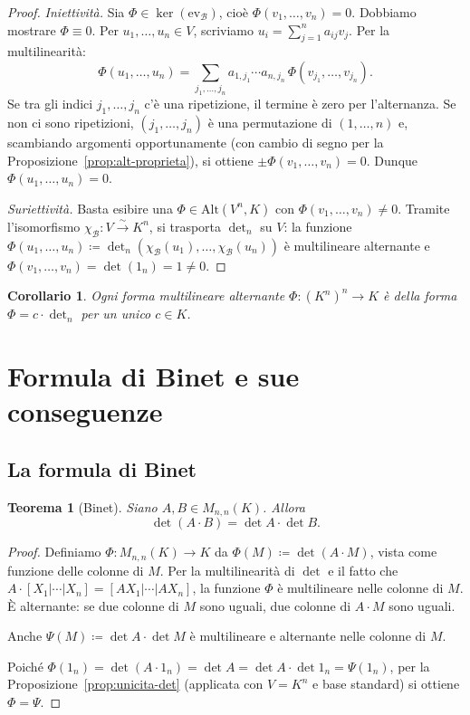 \documentclass[11pt, a4paper]{book}
\theoremstyle{definition}
\theoremstyle{plain}
\newtheorem{teorema}[definizione]{Teorema}
\newtheorem{corollario}[definizione]{Corollario}
\theoremstyle{remark}
\begin{document}
\begin{proof}
\emph{Iniettività.} Sia $\Phi \in \ker(\mathrm{ev}_{\mathcal{B}})$, cioè $\Phi(v_1,\ldots,v_n)=0$. Dobbiamo mostrare $\Phi \equiv 0$. Per $u_1,\ldots,u_n \in V$, scriviamo $u_i = \sum_{j=1}^n a_{ij}v_j$. Per la multilinearità:
\[
  \Phi(u_1,\ldots,u_n) = \sum_{j_1,\ldots,j_n} a_{1,j_1}\cdots a_{n,j_n}\,\Phi(v_{j_1},\ldots,v_{j_n}).
\]
Se tra gli indici $j_1,\ldots,j_n$ c'è una ripetizione, il termine è zero per l'alternanza. Se non ci sono ripetizioni, $(j_1,\ldots,j_n)$ è una permutazione di $(1,\ldots,n)$ e, scambiando argomenti opportunamente (con cambio di segno per la Proposizione~\ref{prop:alt-proprieta}), si ottiene $\pm\Phi(v_1,\ldots,v_n) = 0$. Dunque $\Phi(u_1,\ldots,u_n)=0$.

\emph{Suriettività.} Basta esibire una $\Phi \in \mathrm{Alt}(V^n,K)$ con $\Phi(v_1,\ldots,v_n) \neq 0$. Tramite l'isomorfismo $\chi_{\mathcal{B}} \colon V \xrightarrow{\sim} K^n$, si trasporta $\det_n$ su $V$: la funzione $\Phi(u_1,\ldots,u_n) \coloneqq \det_n(\chi_{\mathcal{B}}(u_1),\ldots,\chi_{\mathcal{B}}(u_n))$ è multilineare alternante e $\Phi(v_1,\ldots,v_n) = \det(1_n) = 1 \neq 0$.
\end{proof}

\begin{corollario}
Ogni forma multilineare alternante $\Phi \colon (K^n)^n \to K$ è della forma $\Phi = c\cdot\det_n$ per un unico $c \in K$.
\end{corollario}

\section{Formula di Binet e sue conseguenze}
\label{sec:binet}

\subsection{La formula di Binet}

\begin{teorema}[Binet]
\label{thm:binet}
Siano $A, B \in M_{n,n}(K)$. Allora
\[
  \det(A \cdot B) = \det A \cdot \det B.
\]
\end{teorema}

\begin{proof}
Definiamo $\Phi \colon M_{n,n}(K) \to K$ da $\Phi(M) \coloneqq \det(A \cdot M)$, vista come funzione delle colonne di $M$. Per la multilinearità di $\det$ e il fatto che $A \cdot [X_1|\cdots|X_n] = [AX_1|\cdots|AX_n]$, la funzione $\Phi$ è multilineare nelle colonne di $M$. È alternante: se due colonne di $M$ sono uguali, due colonne di $A\cdot M$ sono uguali.

Anche $\Psi(M) \coloneqq \det A \cdot \det M$ è multilineare e alternante nelle colonne di $M$.

Poiché $\Phi(1_n) = \det(A\cdot 1_n) = \det A = \det A \cdot \det 1_n = \Psi(1_n)$, per la Proposizione~\ref{prop:unicita-det} (applicata con $V=K^n$ e base standard) si ottiene $\Phi = \Psi$.
\end{proof}
\end{document}
